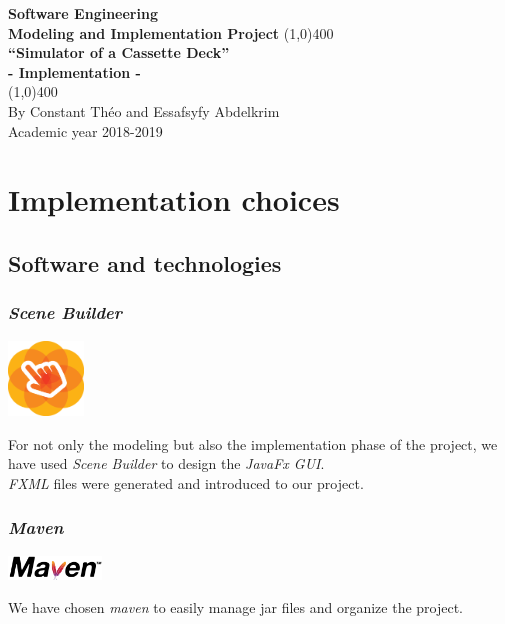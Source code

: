 \documentclass[11pt]{article}
\begin{document}
\begin{titlepage}
\begin{center}
\vspace*{1cm}
\Large{\textbf{Software Engineering}}\\
\Large{\textbf{Modeling and Implementation Project}}
\vfill
\line(1,0){400}\\[1mm]
\huge{\textbf{“Simulator of a Cassette Deck”}}\\[3mm]
\Large{\textbf{- Implementation -}}\\[1mm]
\line(1,0){400}\\
\vfill
By Constant Théo and Essafsyfy Abdelkrim\\
Academic year 2018-2019
\end{center}
\end{titlepage}

\tableofcontents
\thispagestyle{empty}
\clearpage
\setcounter{page}{1}

\section{Implementation choices}
\label{sec:implChoices}
\subsection{Software and technologies}
\subsubsection{\textit{Scene Builder}}
\begin{center}
\includegraphics[width=2cm]{./img/SceneBuilder.png}\\
\end{center}
For not only the modeling but also the implementation phase of the project, we have used \textit{Scene Builder} to design the \textit{JavaFx GUI}.\\
\textit{FXML} files were generated and introduced to our project.
\subsubsection{\textit{Maven}}
\begin{center}
\includegraphics[width=2.5cm]{./img/maven.png}\\
\end{center}
We have chosen \textit{maven} to easily manage jar files and organize the project.
\end{document}
